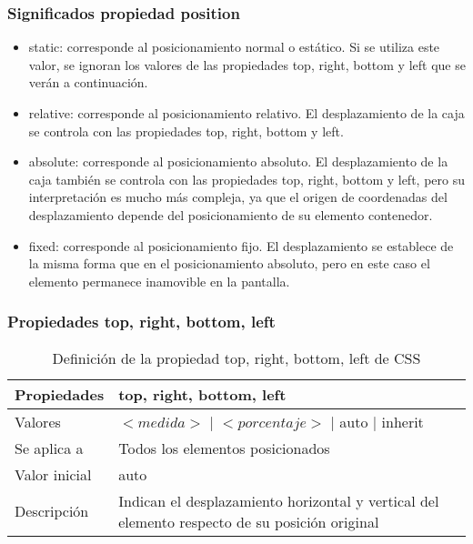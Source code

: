 
\begin{frame}
\frametitle{Significados propiedad position}

\begin{itemize}
  \item static: corresponde al posicionamiento normal o estático. Si se utiliza este valor, se ignoran los valores de las propiedades top, right, bottom y left que se verán a continuación.
  \item relative: corresponde al posicionamiento relativo. El desplazamiento de la caja se controla con las propiedades top, right, bottom y left.
  \item absolute: corresponde al posicionamiento absoluto. El desplazamiento de la caja también se controla con las propiedades top, right, bottom y left, pero su interpretación es mucho más compleja, ya que el origen de coordenadas del desplazamiento depende del posicionamiento de su elemento contenedor.
  \item fixed: corresponde al posicionamiento fijo. El desplazamiento se establece de la misma forma que en el posicionamiento absoluto, pero en este caso el elemento permanece inamovible en la pantalla.
\end{itemize}

\end{frame}



\begin{frame}
\frametitle{Propiedades top, right, bottom, left}

\begin{center}
  \begin{table}
   \begin{tabular}{p{1.8cm}p{7.8cm}}
Propiedades& {\bf top}, {\bf right}, {\bf bottom}, {\bf left} \\ \hline
Valores& $<medida>$ | $<porcentaje>$ | auto | inherit \\ \hline
Se aplica a& Todos los elementos posicionados \\ \hline
Valor inicial& auto \\ \hline
Descripción& Indican el desplazamiento horizontal y vertical del elemento respecto de su posición original \\ \hline
  \end{tabular}
   \caption{Definición de la propiedad top, right, bottom, left de CSS}
 \end{table}
\end{center}


\end{frame}


